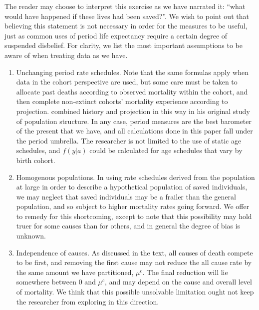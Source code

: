 \documentclass{article}
\begin{document}
The reader may choose to interpret this exercise as we
have narrated it: ``what would have happened if these lives had been saved?''. We wish to point out that believing
this statement is not necessary in order for the measures to be useful, just as common uses of
period life expectancy require a certain degree of suspended disbelief. For
clarity, we list the most important assumptions to be aware of when treating
data as we have.
\begin{enumerate}
\item Unchanging period rate schedules. Note that the same formulas apply when
data in the cohort perspective are used, but some care must be taken to allocate past deaths according to observed mortality within the cohort, and then complete non-extinct
cohorts' mortality experience according to
projection. \citet{brouard1986structure} combined history and projection
in this way in his original study of population structure.  In any case, period measures are the best barometer of the
present that we have, and all calculations done in this paper fall under the
period umbrella. The researcher is not limited to the use of static age
schedules, and $f(y|a)$ could be calculated for age schedules that vary
by birth cohort.
\item Homogenous populations. In using rate schedules derived from the
population at large in order to describe a hypothetical population of saved
individuals, we may neglect that saved individuals may be a frailer than the
general population, and so subject to higher mortality rates going forward. We
offer to remedy for this shortcoming, except to note that this possibility may
hold truer for some causes than for others, and in general the degree of bias is
unknown.
\item Independence of causes. As discussed in the text, all causes of death
compete to be first, and removing the first cause may not reduce the all cause
rate by the same amount we have partitioned, $\mu^c$. The final reduction will
lie somewhere between 0 and $\mu^c$, and may depend on the cause and
overall level of mortality. We think that this possible unsolvable limitation
ought not keep the researcher from exploring in this direction.
\end{enumerate}
\end{document}
